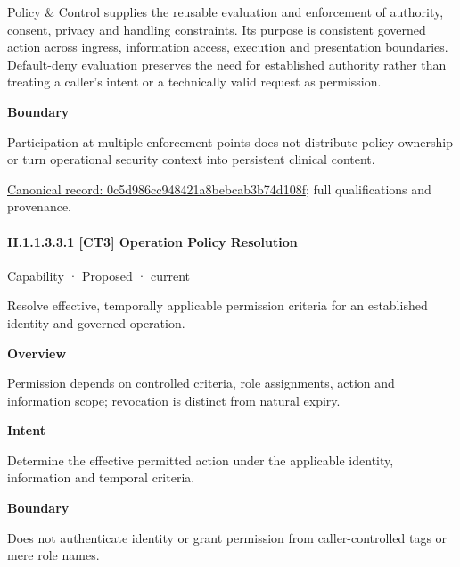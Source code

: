 Policy \& Control supplies the reusable evaluation and enforcement of authority, consent, privacy and handling constraints. Its purpose is consistent governed action across ingress, information access, execution and presentation boundaries. Default-deny evaluation preserves the need for established authority rather than treating a caller's intent or a technically valid request as permission.



\textbf{Boundary}



Participation at multiple enforcement points does not distribute policy ownership or turn operational security context into persistent clinical content.


{\footnotesize \href{../../../../../../../continuum/strategy/capability/0c5d986cc948421a8bebcab3b74d108f.md}{Canonical record: 0c5d986cc948421a8bebcab3b74d108f}; full qualifications and provenance.}\par
\paragraph*{II.1.1.3.3.1 [CT3] Operation Policy Resolution}
\label{navigation:II.1.1.3.3.1}

\label{element:7eca9fc4d2244b0facc83376e57ebbc4}
{\small Capability · Proposed · current}\par

Resolve effective, temporally applicable permission criteria for an established identity and governed operation.



\textbf{Overview}



Permission depends on controlled criteria, role assignments, action and information scope; revocation is distinct from natural expiry.



\textbf{Intent}



Determine the effective permitted action under the applicable identity, information and temporal criteria.



\textbf{Boundary}



Does not authenticate identity or grant permission from caller-controlled tags or mere role names.


